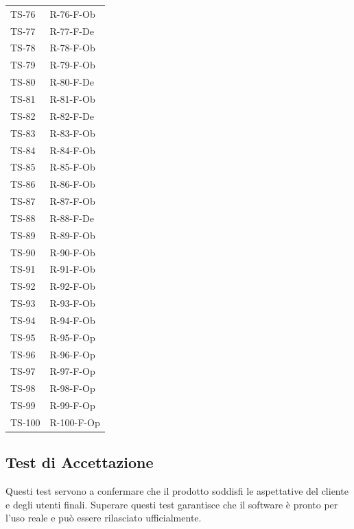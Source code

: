 \documentclass[a4paper, 11pt]{article}
\begin{document}
\begin{longtable}{>{\centering\arraybackslash}m{2.5cm} >{\centering\arraybackslash}m{3.5cm}}
TS-76 & R-76-F-Ob \\
TS-77 & R-77-F-De \\
TS-78 & R-78-F-Ob \\
TS-79 & R-79-F-Ob \\
TS-80 & R-80-F-De \\
TS-81 & R-81-F-Ob \\
TS-82 & R-82-F-De \\
TS-83 & R-83-F-Ob \\
TS-84 & R-84-F-Ob \\
TS-85 & R-85-F-Ob \\
TS-86 & R-86-F-Ob \\
TS-87 & R-87-F-Ob \\
TS-88 & R-88-F-De \\
TS-89 & R-89-F-Ob \\
TS-90 & R-90-F-Ob \\
TS-91 & R-91-F-Ob \\
TS-92 & R-92-F-Ob \\
TS-93 & R-93-F-Ob \\
TS-94 & R-94-F-Ob \\
TS-95 & R-95-F-Op \\
TS-96 & R-96-F-Op \\
TS-97 & R-97-F-Op \\
TS-98 & R-98-F-Op \\
TS-99 & R-99-F-Op \\
TS-100 & R-100-F-Op \\

\end{longtable}

\subsection{Test di Accettazione}
Questi test servono a confermare che il prodotto soddisfi le aspettative del cliente e degli utenti finali. Superare questi test garantisce che il software è pronto per l'uso reale e può essere rilasciato ufficialmente.
\end{document}
